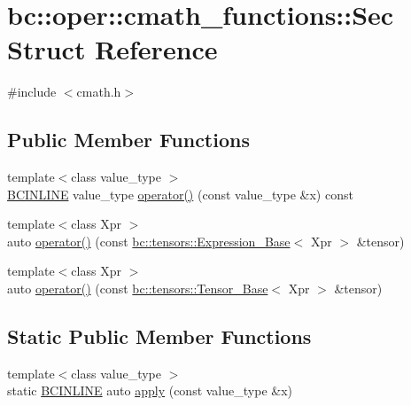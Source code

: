\hypertarget{structbc_1_1oper_1_1cmath__functions_1_1Sec}{}\section{bc\+:\+:oper\+:\+:cmath\+\_\+functions\+:\+:Sec Struct Reference}
\label{structbc_1_1oper_1_1cmath__functions_1_1Sec}


{\ttfamily \#include $<$cmath.\+h$>$}

\subsection*{Public Member Functions}
\begin{DoxyCompactItemize}
\item 
{\footnotesize template$<$class value\+\_\+type $>$ }\\\hyperlink{common_8h_a6699e8b0449da5c0fafb878e59c1d4b1}{B\+C\+I\+N\+L\+I\+NE} value\+\_\+type \hyperlink{structbc_1_1oper_1_1cmath__functions_1_1Sec_aa1a9cae92fbc6ea4edc6527c9951d9ca}{operator()} (const value\+\_\+type \&x) const
\item 
{\footnotesize template$<$class Xpr $>$ }\\auto \hyperlink{structbc_1_1oper_1_1cmath__functions_1_1Sec_a4b324f4b2d79068c5523349d07b5565f}{operator()} (const \hyperlink{classbc_1_1tensors_1_1Expression__Base}{bc\+::tensors\+::\+Expression\+\_\+\+Base}$<$ Xpr $>$ \&tensor)
\item 
{\footnotesize template$<$class Xpr $>$ }\\auto \hyperlink{structbc_1_1oper_1_1cmath__functions_1_1Sec_aa5360e154a964b8f7c3797a14be39280}{operator()} (const \hyperlink{classbc_1_1tensors_1_1Tensor__Base}{bc\+::tensors\+::\+Tensor\+\_\+\+Base}$<$ Xpr $>$ \&tensor)
\end{DoxyCompactItemize}
\subsection*{Static Public Member Functions}
\begin{DoxyCompactItemize}
\item 
{\footnotesize template$<$class value\+\_\+type $>$ }\\static \hyperlink{common_8h_a6699e8b0449da5c0fafb878e59c1d4b1}{B\+C\+I\+N\+L\+I\+NE} auto \hyperlink{structbc_1_1oper_1_1cmath__functions_1_1Sec_a37486c726faad68b0d28a44c26ee8270}{apply} (const value\+\_\+type \&x)
\end{DoxyCompactItemize}


